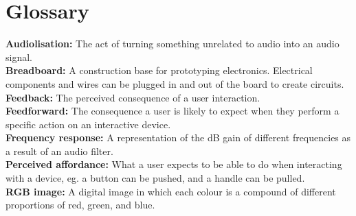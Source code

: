 \chapter*{Glossary}\label{ch:glossary}

\textbf{Audiolisation:} The act of turning something unrelated to audio into an audio signal.\\
\textbf{Breadboard:} A construction base for prototyping electronics. Electrical components and wires can be plugged in and out of the board to create circuits.\\
\textbf{Feedback:} The perceived consequence of a user interaction. \\
\textbf{Feedforward:} The consequence a user is likely to expect when they perform a specific action on an interactive device.\\
\textbf{Frequency response:} A representation of the dB gain of different frequencies as a result of an audio filter. \\
\textbf{Perceived affordance:} What a user expects to be able to do when interacting with a device, eg. a button can be pushed, and a handle can be pulled.\\
\textbf{RGB image:} A digital image in which each colour is a compound of different proportions of red, green, and blue.